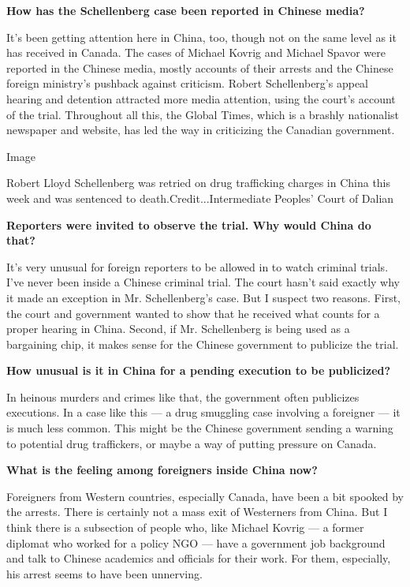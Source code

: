 \textbf{How has the Schellenberg case been reported in Chinese media?}

It's been getting attention here in China, too, though not on the same
level as it has received in Canada. The cases of Michael Kovrig and
Michael Spavor were reported in the Chinese media, mostly accounts of
their arrests and the Chinese foreign ministry's pushback against
criticism. Robert Schellenberg's appeal hearing and detention attracted
more media attention, using the court's account of the trial. Throughout
all this, the Global Times, which is a brashly nationalist newspaper and
website, has led the way in criticizing the Canadian government.

Image

Robert Lloyd Schellenberg was retried on drug trafficking charges in
China this week and was sentenced to death.Credit...Intermediate
Peoples' Court of Dalian

\textbf{Reporters were invited to observe the trial. Why would China do
that?}

It's very unusual for foreign reporters to be allowed in to watch
criminal trials. I've never been inside a Chinese criminal trial. The
court hasn't said exactly why it made an exception in Mr. Schellenberg's
case. But I suspect two reasons. First, the court and government wanted
to show that he received what counts for a proper hearing in China.
Second, if Mr. Schellenberg is being used as a bargaining chip, it makes
sense for the Chinese government to publicize the trial.

\textbf{How unusual is it in China for a pending execution to be
publicized?}

In heinous murders and crimes like that, the government often publicizes
executions. In a case like this --- a drug smuggling case involving a
foreigner --- it is much less common. This might be the Chinese
government sending a warning to potential drug traffickers, or maybe a
way of putting pressure on Canada.

\textbf{What is the feeling among foreigners inside China now?}

Foreigners from Western countries, especially Canada, have been a bit
spooked by the arrests. There is certainly not a mass exit of Westerners
from China. But I think there is a subsection of people who, like
Michael Kovrig --- a former diplomat who worked for a policy NGO ---
have a government job background and talk to Chinese academics and
officials for their work. For them, especially, his arrest seems to have
been unnerving.

